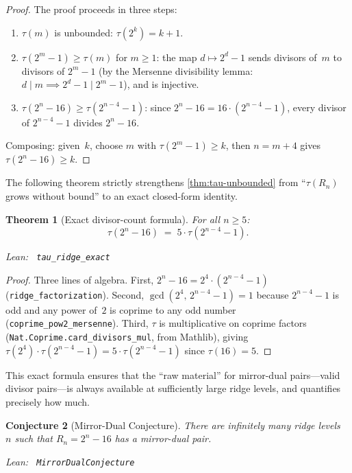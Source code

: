 \documentclass[11pt,a4paper]{article}
\newenvironment{leanref}%
  {\par\smallskip\noindent\begingroup\raggedright\textup{Lean:}~}%
  {\par\endgroup}
\newtheorem{theorem}{Theorem}[section]
\newtheorem{conjecture}[theorem]{Conjecture}
\theoremstyle{definition}
\newcommand{\Rn}{R_n}
\begin{document}
\begin{proof}
The proof proceeds in three steps:
\begin{enumerate}[nosep]
\item $\tau(m)$ is unbounded: $\tau(2^k) = k + 1$.
\item $\tau(2^m - 1) \ge \tau(m)$ for $m \ge 1$: the map
  $d \mapsto 2^d - 1$ sends divisors of~$m$ to divisors of $2^m - 1$
  (by the Mersenne divisibility lemma: $d \mid m \implies
  2^d - 1 \mid 2^m - 1$), and is injective.
\item $\tau(2^n - 16) \ge \tau(2^{n-4} - 1)$: since
  $2^n - 16 = 16 \cdot (2^{n-4} - 1)$, every divisor of $2^{n-4} - 1$
  divides $2^n - 16$.
\end{enumerate}
Composing: given~$k$, choose $m$ with $\tau(2^m - 1) \ge k$, then
$n = m + 4$ gives $\tau(2^n - 16) \ge k$.
\end{proof}

The following theorem strictly strengthens \cref{thm:tau-unbounded} from
``$\tau(\Rn)$ grows without bound'' to an exact closed-form identity.

\begin{theorem}[Exact divisor-count formula]\label{thm:tau-exact}
For all $n \ge 5$:
\[
  \tau(2^n - 16) \;=\; 5 \cdot \tau(2^{n-4} - 1).
\]

\begin{leanref} \lstinline|tau_ridge_exact|
\end{leanref}
\end{theorem}

\begin{proof}
Three lines of algebra.  First, $2^n - 16 = 2^4 \cdot (2^{n-4} - 1)$
(\lstinline|ridge_factorization|).  Second, $\gcd(2^4,\, 2^{n-4} - 1) = 1$
because $2^{n-4} - 1$ is odd and any power of~$2$ is coprime to any
odd number (\lstinline|coprime_pow2_mersenne|).  Third, $\tau$ is
multiplicative on coprime factors
(\lstinline|Nat.Coprime.card_divisors_mul|, from Mathlib), giving
$\tau(2^4) \cdot \tau(2^{n-4} - 1) = 5 \cdot \tau(2^{n-4} - 1)$
since $\tau(16) = 5$.
\end{proof}

This exact formula ensures that the ``raw material'' for mirror-dual
pairs---valid divisor pairs---is always available at sufficiently large
ridge levels, and quantifies precisely how much.

\begin{conjecture}[Mirror-Dual Conjecture]\label{conj:mirror}
There are infinitely many ridge levels~$n$ such that $\Rn = 2^n - 16$
has a mirror-dual pair.

\begin{leanref} \lstinline|MirrorDualConjecture|
\end{leanref}
\end{conjecture}
\end{document}
